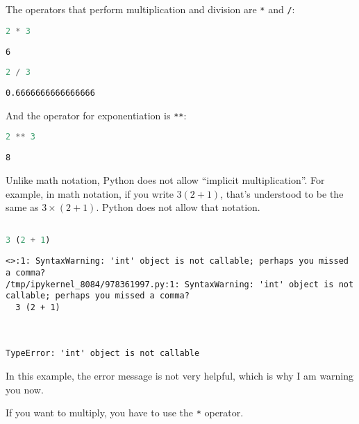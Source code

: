 The operators that perform multiplication and division are
\passthrough{\lstinline!*!} and \passthrough{\lstinline!/!}:

\begin{lstlisting}[language=Python,style=source]
2 * 3
\end{lstlisting}

\begin{lstlisting}[style=output]
6
\end{lstlisting}

\begin{lstlisting}[language=Python,style=source]
2 / 3
\end{lstlisting}

\begin{lstlisting}[style=output]
0.6666666666666666
\end{lstlisting}

And the operator for exponentiation is \passthrough{\lstinline!**!}:

\begin{lstlisting}[language=Python,style=source]
2 ** 3
\end{lstlisting}

\begin{lstlisting}[style=output]
8
\end{lstlisting}

Unlike math notation, Python does not allow ``implicit multiplication''.
For example, in math notation, if you write \(3 (2 + 1)\), that's
understood to be the same as \(3 \times (2+ 1)\). Python does not allow
that notation.

\begin{lstlisting}[language=Python,style=source]
%%expect TypeError

3 (2 + 1)
\end{lstlisting}

\begin{lstlisting}[style=output]
<>:1: SyntaxWarning: 'int' object is not callable; perhaps you missed a comma?
/tmp/ipykernel_8084/978361997.py:1: SyntaxWarning: 'int' object is not callable; perhaps you missed a comma?
  3 (2 + 1)



TypeError: 'int' object is not callable
\end{lstlisting}

In this example, the error message is not very helpful, which is why I
am warning you now.

If you want to multiply, you have to use the \passthrough{\lstinline!*!}
operator.

